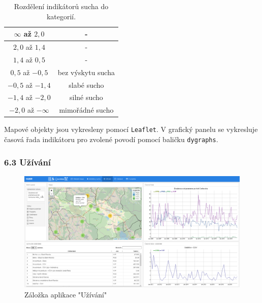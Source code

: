 \documentclass[12pt,]{article}
\begin{document}
\begin{table}[H]
\centering
\begin{tabular}{|c|c|}
\hline
$\infty$ až $2,0$   & -                 \\ \hline
$2,0$ až $1,4$      & -                 \\ \hline
$1,4$ až $0,5$      & -                 \\ \hline
$0,5$ až $-0,5$     & bez výskytu sucha \\ \hline
$-0,5$ až $-1,4$    & slabé sucho       \\ \hline
$-1,4$ až $-2,0$    & silné sucho       \\ \hline
$-2,0$ až $-\infty$ & mimořádné sucho   \\ \hline
\end{tabular}
\caption{Rozdělení indikátorů sucha do kategorií.}
\label{tab9}
\end{table}

\vspace*{-0.3cm}

\qquad Mapové objekty jsou vykresleny pomocí \texttt{Leaflet}. V
grafický panelu se vykresluje časová řada indikátoru pro zvolené povodí
pomocí baličku \texttt{dygraphs}.

\subsubsection{6.3 Užívání}\label{uzivani}

\begin{figure}[H]
      \includegraphics[width=\textwidth]{fig/P_uzivani}
      \caption{Záložka aplikace "Užívání"}
      \label{fig:ch5.5}
\end{figure}

\vspace*{-0.3cm}
\end{document}
